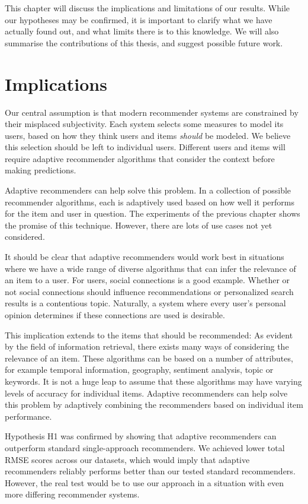 \label{chap:discussion}

This chapter will discuss the implications and limitations of our results.
While our hypotheses may be confirmed,
it is important to clarify what we have actually found out,
and what limits there is to this knowledge.
We will also summarise the contributions of this thesis,
and suggest possible future work.


\section{Implications}      

Our central assumption is that modern recommender systems 
are constrained by their misplaced subjectivity.
Each system selects some measures to model its users, 
based on how they think users and items \emph{should} be modeled.
We believe this selection should be left to individual users.
Different users and items will require adaptive recommender algorithms that
consider the context before making predictions.

Adaptive recommenders can help solve this problem.
In a collection of possible recommender algorithms, each is adaptively used based 
on how well it performs for the item and user in question.
The experiments of the previous chapter shows the promise of this technique.
However, there are lots of use cases not yet considered.

It should be clear that adaptive recommenders would work best in situations where
we have a wide range of diverse algorithms that can infer the relevance of an item to a user.
For users, social connections is a good example. Whether or not social connections should influence
recommendations or personalized search results is a contentious topic.
Naturally, a system where every user's personal opinion determines if these connections are used is desirable.

This implication extends to the items that should be recommended:
As evident by the field of information retrieval,
there exists many ways of considering the relevance of an item. 
These algorithms can be based on a number of attributes, for example
temporal information, geography, sentiment analysis, topic or keywords.
It is not a huge leap to assume that these algorithms may have
varying levels of accuracy for individual items.
Adaptive recommenders can help solve this problem by adaptively 
combining the recommenders based on individual item performance.

Hypothesis H1 was confirmed by showing that adaptive recommenders
can outperform standard single-approach recommenders.
We achieved lower total RMSE scores across our datasets,
which would imply that adaptive recommenders
reliably performs better than our tested standard recommenders.
However, the real test would be to use our approach
in a situation with even more differing recommender systems.


